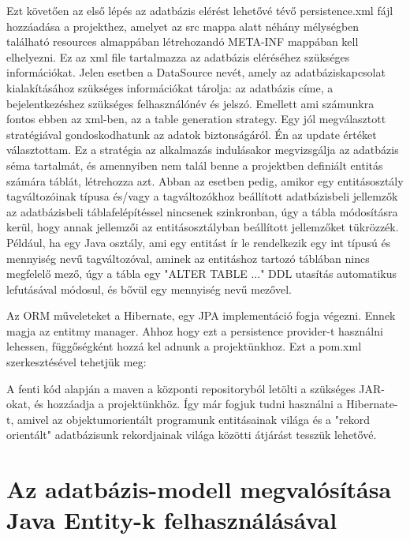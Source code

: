 \documentclass[centeredchapter]{thesis-ekf}
\theoremstyle{definition}
\theoremstyle{remark}
\begin{document}
Ezt követően az első lépés az adatbázis elérést lehetővé tévő persistence.xml fájl hozzáadása a projekthez, amelyet az src mappa alatt néhány mélységben található resources almappában létrehozandó META-INF mappában kell elhelyezni. Ez az xml file tartalmazza az adatbázis eléréséhez szükséges információkat. Jelen esetben a DataSource nevét, amely az adatbáziskapcsolat kialakításához szükséges információkat tárolja: az adatbázis címe, a bejelentkezéshez szükséges felhasználónév és jelszó.
Emellett ami számunkra fontos ebben az xml-ben, az a table generation strategy. Egy jól megválasztott stratégiával gondoskodhatunk az adatok biztonságáról. Én az update értéket választottam. Ez a stratégia az alkalmazás indulásakor megvizsgálja az adatbázis séma tartalmát, és amennyiben nem talál benne a projektben definiált entitás számára táblát, létrehozza azt. Abban az esetben pedig, amikor egy entitásosztály tagváltozóinak típusa és/vagy a tagváltozókhoz beállított adatbázisbeli jellemzők az adatbázisbeli táblafelépítéssel nincsenek szinkronban, úgy a tábla módosításra kerül, hogy annak jellemzői az entitásosztályban beállított jellemzőket tükrözzék.
Például, ha egy Java osztály, ami egy entitást ír le rendelkezik egy int típusú és mennyiség nevű tagváltozóval, aminek az entitáshoz tartozó táblában nincs megfelelő mező, úgy a tábla egy "ALTER TABLE ..." DDL utasítás automatikus lefutásával módosul, és bővül egy mennyiség nevű mezővel. 

Az ORM műveleteket a Hibernate, egy JPA implementáció fogja végezni. Ennek magja az entitmy manager. Ahhoz hogy ezt a persistence provider-t használni lehessen, függőségként hozzá kel adnunk a projektünkhoz. Ezt a pom.xml szerkesztésével tehetjük meg:




A fenti kód alapján a maven a központi repositoryból letölti a szükséges JAR-okat, és hozzáadja a projektünkhöz. Így már fogjuk tudni használni a Hibernate-t, amivel az objektumorientált programunk entitásainak világa és a "rekord orientált" adatbázisunk rekordjainak világa közötti átjárást tesszük lehetővé.

\section{Az adatbázis-modell megvalósítása Java Entity-k felhasználásával}
\end{document}

